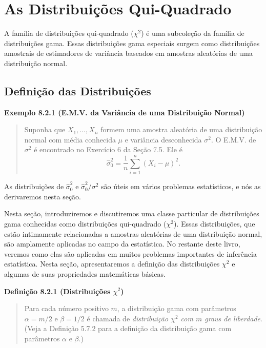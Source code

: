\section{As Distribuições Qui-Quadrado}

A família de distribuições qui-quadrado ($\chi^2$) é uma subcoleção da família de distribuições gama. Essas distribuições gama especiais surgem como distribuições amostrais de estimadores de variância baseados em amostras aleatórias de uma distribuição normal.

\subsection*{Definição das Distribuições}

\vspace{1em}
\noindent\textbf{Exemplo 8.2.1 (E.M.V. da Variância de uma Distribuição Normal)}
\begin{quote}
    Suponha que $X_1, \dots, X_n$ formem uma amostra aleatória de uma distribuição normal com média conhecida $\mu$ e variância desconhecida $\sigma^2$. O E.M.V. de $\sigma^2$ é encontrado no Exercício 6 da Seção 7.5. Ele é
    $$
    \hat{\sigma}_0^2 = \frac{1}{n} \sum_{i=1}^{n} (X_i - \mu)^2.
    $$
\end{quote}
\vspace{1em}

As distribuições de $\hat{\sigma}_0^2$ e $\hat{\sigma}_0^2/\sigma^2$ são úteis em vários problemas estatísticos, e nós as derivaremos nesta seção.

Nesta seção, introduziremos e discutiremos uma classe particular de distribuições gama conhecidas como distribuições qui-quadrado ($\chi^2$). Essas distribuições, que estão intimamente relacionadas a amostras aleatórias de uma distribuição normal, são amplamente aplicadas no campo da estatística. No restante deste livro, veremos como elas são aplicadas em muitos problemas importantes de inferência estatística. Nesta seção, apresentaremos a definição das distribuições $\chi^2$ e algumas de suas propriedades matemáticas básicas.

\vspace{1em}
\noindent\textbf{Definição 8.2.1 (Distribuições $\chi^2$)}
\begin{quote}
    Para cada número positivo $m$, a distribuição gama com parâmetros $\alpha = m/2$ e $\beta=1/2$ é chamada de \textit{distribuição $\chi^2$ com $m$ graus de liberdade}. (Veja a Definição 5.7.2 para a definição da distribuição gama com parâmetros $\alpha$ e $\beta$.)
\end{quote}
\vspace{1em}

